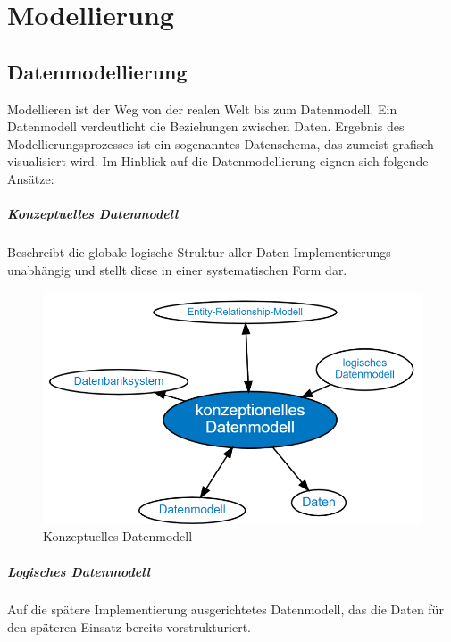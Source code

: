 \chapter{Modellierung}\label{cha:modellierung}

\section{Datenmodellierung}

Modellieren ist der Weg von der realen Welt bis zum Datenmodell. Ein Datenmodell verdeutlicht die Beziehungen zwischen Daten. Ergebnis des Modellierungsprozesses ist ein sogenanntes Datenschema, das zumeist grafisch visualisiert wird.
Im Hinblick auf die Datenmodellierung eignen sich folgende Ansätze:

\paragraph{Konzeptuelles Datenmodell}
Beschreibt die globale logische Struktur aller Daten Implementierungs-unabhängig und stellt diese in einer systematischen Form dar.

\begin{figure}[h]
    \centering
    \includegraphics[width=.75\textwidth]{Content/images/modellierung/konzeptionell.png}
    \caption{Konzeptuelles Datenmodell}
    \label{fig:modellierung:konzeptuell}
 \end{figure}

 \paragraph{Logisches Datenmodell}
 Auf die spätere Implementierung ausgerichtetes Datenmodell, das die Daten für den späteren Einsatz bereits vorstrukturiert.

